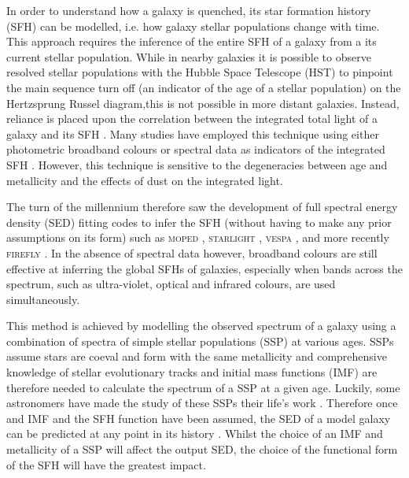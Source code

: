 In order to understand how a galaxy is quenched, its star formation history (SFH) can be modelled, i.e. how galaxy stellar populations change with time. This approach requires the inference of the entire SFH of a galaxy from a its current stellar population. While in nearby galaxies it is possible to observe resolved stellar populations with the Hubble Space Telescope (HST) to pinpoint the main sequence turn off (an indicator of the age of a stellar population) on the Hertzsprung Russel diagram,this is not possible in more distant galaxies. Instead, reliance is placed upon the correlation between the integrated total light of a galaxy and its SFH \citep{searle73}. Many studies have employed this technique using either photometric broadband colours or spectral data as indicators of the integrated SFH \citep[for example][]{deJong96, kauffmann03, dressler04, macarthur04, Martin07, perez11, sanchez11}. However, this technique is sensitive to the degeneracies between age and metallicity \citep{worthey94} and the effects of dust \citep{ganda09, pastrav13} on the integrated light. 

The turn of the millennium therefore saw the development of full spectral energy density (SED) fitting codes to infer the SFH (without having to make any prior assumptions on its form) such as \textsc{moped} \citep{heavens00}, \textsc{starlight} \citep{cidfernandes05}, \textsc{vespa} \citep{tojeiro07}, and more recently \textsc{firefly} \citep{wilkinson15}. In the absence of spectral data however, broadband colours are still effective at inferring the global SFHs of galaxies, especially when bands across the spectrum, such as ultra-violet, optical and infrared colours, are used simultaneously. 

This method is achieved by modelling the observed spectrum of a galaxy using a combination of spectra of simple stellar populations (SSP) at various ages. SSPs assume stars are coeval and form with the same metallicity and comprehensive knowledge of stellar evolutionary tracks and initial mass functions (IMF) are therefore needed to calculate the spectrum of a SSP at a given age. Luckily, some astronomers have made the study of these SSPs their life's work \citep{BC03, Maraston05, vazquez05}. Therefore once and IMF and the SFH function have been assumed, the SED of a model galaxy can be predicted at any point in its history \citep{chen10}. Whilst the choice of an IMF and metallicity of a SSP will affect the output SED, the choice of the functional form of the SFH will have the greatest impact. 

